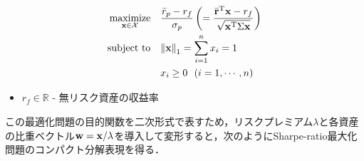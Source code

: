                                                                     \begin{align}
                                                                        \underset{\bf x \in \mathcal{X}}{\rm maximize} ~~~ 
                                                                            &\frac{\bar{r}_p - r_f}{\sigma_p}
                                                                                \left( 
                                                                                    = \frac{\bar{\bf r}^{\mathrm{T}} {\bf x} - r_f}{\sqrt{{\bf x}^{\mathrm{T}} \Sigma {\bf x}}}
                                                                                        \right) \\
                                                                                            {\rm subject~to} ~~~ 
                                                                                                &{\| {\bf x} \|}_{1} = \sum_{i=1}^{n} x_i = 1 \\
                                                                                                    &x_i \geq 0 ~~ (i = 1, \cdots, n)
                                                                                                    \end{align}

                                                                                                    \begin{itemize}
                                                                                                        \item $r_f \in \mathbb{R}$ - 無リスク資産の収益率
                                                                                                        \end{itemize}

                                                                                                        この最適化問題の目的関数を二次形式で表すため，リスクプレミアム$\lambda$と各資産の比重ベクトル${\bf w} = {\bf x} / \lambda$を導入して変形すると，次のようにSharpe-ratio最大化問題のコンパクト分解表現を得る．

